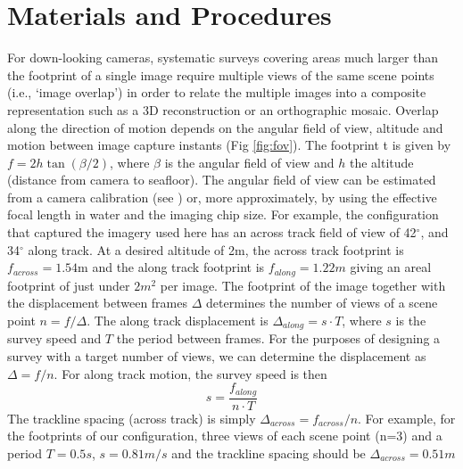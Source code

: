\section{Materials and Procedures}
\label{sec:MandP}


For down-looking cameras, systematic surveys covering areas much larger than the footprint of a single image require multiple views of the same scene points (i.e., `image overlap') in order to relate the multiple images into a composite representation such as a 3D reconstruction or an orthographic mosaic. Overlap along the direction of motion depends on the angular field of view, altitude and motion between image capture instants (Fig \ref{fig:fov}). The footprint t is given by $f = 2 h \tan(\beta/2)$, where $\beta$ is the angular field of view and $h$ the altitude (distance from camera to seafloor). The angular field of view can be estimated from a camera calibration (see \cite{}) or, more approximately, by using the effective focal length in water and the imaging chip size. For example, the configuration that captured the imagery used here has an across track field of view of 42$^\circ$, and 34$^\circ$ along track. At a desired altitude of 2m, the across track footprint is $f_{across}=1.54\mathrm{m}$ and the along track footprint is $f_{along}=1.22m$ giving an areal footprint of just under $2m^2$ per image. 
The footprint of the image together with the displacement between frames $\Delta$ determines the number of views of a scene point $n = f /\Delta$. The along track displacement is $\Delta_{along} = s \cdot T$, where $s$ is the survey speed and $T$ the period between frames. 
For the purposes of designing a survey with a target number of views, we can determine the displacement as $\Delta = f/n$. For along track motion, the survey speed is then
\begin{equation}
s = \frac{f_{along}}{n \cdot T}
\end{equation}
The trackline spacing (across track) is simply $\Delta_{across} = f_{across}/n$.
For example, for the footprints of our configuration, three views of each scene point (n=3) and a period $T=0.5s$, $s=0.81m/s$ and the trackline spacing should be $\Delta_{across} = 0.51m$

